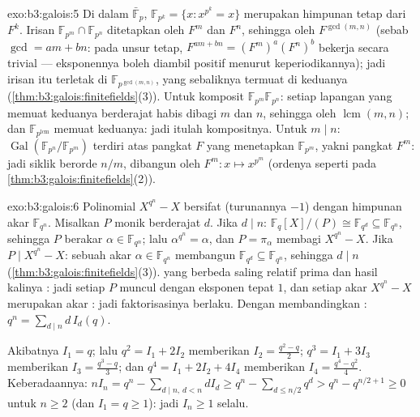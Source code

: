 \begin{solution}{exo:b3:galois:5}
Di dalam $\bar{\mathbb F}_p$, $\mathbb F_{p^k} = \{x : x^{p^k} =
x\}$ merupakan himpunan tetap dari $F^k$. Irisan $\mathbb F_{p^m}
\cap \mathbb F_{p^n}$ ditetapkan oleh $F^m$ dan $F^n$, sehingga oleh
$F^{\gcd(m,n)}$ (sebab $\gcd = am + bn$: pada unsur tetap, $F^{am +
bn} = (F^m)^a(F^n)^b$ bekerja secara trivial --- eksponennya boleh diambil
positif menurut keperiodikannya); jadi irisan itu terletak di $\mathbb
F_{p^{\gcd(m,n)}}$, yang sebaliknya termuat di keduanya
(\cref{thm:b3:galois:finitefields}(3)). Untuk komposit $\mathbb
F_{p^m}\mathbb F_{p^n}$: setiap lapangan yang memuat keduanya berderajat
habis dibagi $m$ dan $n$, sehingga oleh $\operatorname{lcm}(m,n)$; dan
$\mathbb F_{p^{\operatorname{lcm}}}$ memuat keduanya: jadi itulah
kompositnya. Untuk $m \mid n$: $\operatorname{Gal}(\mathbb
F_{p^n}/\mathbb F_{p^m})$ terdiri atas pangkat $F$ yang menetapkan
$\mathbb F_{p^m}$, yakni pangkat $F^m$: jadi siklik berorde $n/m$,
dibangun oleh $F^m \colon x \mapsto x^{p^m}$ (ordenya seperti pada
\cref{thm:b3:galois:finitefields}(2)).
\end{solution}

\begin{solution}{exo:b3:galois:6}
Polinomial $X^{q^n} - X$ bersifat  (turunannya $-1$) dengan himpunan akar
$\mathbb F_{q^n}$. Misalkan $P$ monik  berderajat $d$.
Jika $d \mid n$: $\mathbb F_q[X]/(P) \cong \mathbb F_{q^d}
\subseteq \mathbb F_{q^n}$, sehingga $P$ berakar $\alpha \in
\mathbb F_{q^n}$; lalu $\alpha^{q^n} = \alpha$, dan $P =
\pi_\alpha$ membagi $X^{q^n} - X$. Jika $P \mid X^{q^n} - X$: sebuah
akar $\alpha \in \mathbb F_{q^n}$ membangun $\mathbb F_{q^d}
\subseteq \mathbb F_{q^n}$, sehingga $d \mid n$
(\cref{thm:b3:galois:finitefields}(3)).  yang berbeda
saling relatif prima dan hasil kalinya : jadi setiap $P$ muncul dengan
eksponen tepat $1$, dan setiap akar $X^{q^n}-X$ merupakan akar
: jadi faktorisasinya berlaku. Dengan membandingkan
: $q^n = \sum_{d\mid n} d\,I_d(q)$.

Akibatnya $I_1 = q$; lalu $q^2 = I_1 + 2I_2$ memberikan $I_2 =
\frac{q^2 - q}2$; $q^3 = I_1 + 3I_3$ memberikan $I_3 = \frac{q^3 -
q}3$; dan $q^4 = I_1 + 2I_2 + 4I_4$ memberikan $I_4 = \frac{q^4 -
q^2}4$. Keberadaannya: $nI_n = q^n - \sum_{d \mid n,\, d < n}
dI_d \geq q^n - \sum_{d \leq n/2} q^d > q^n - q^{n/2 + 1} \geq
0$ untuk $n \geq 2$ (dan $I_1 = q \geq 1$): jadi $I_n \geq 1$ selalu.
\end{solution}

